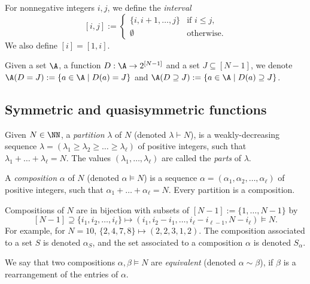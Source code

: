 \begin{definition}
    For nonnegative integers $i,j$, we define the \emph{interval}
    \[
        [i,j] :=
        \begin{cases}
            \{i,i+1,\dots,j\} & \text{if $i \le j$,}\\
            \emptyset & \text{otherwise.}
        \end{cases}
    \]
    We also define $[i] = [1,i]$.
\end{definition}

\begin{definition}
\label{def:elements with given stat}
    Given a set $\A$, a function $D:\A \to 2^{[N-1]}$ and a set $J \subseteq [N-1]$, we denote $\A(D=J) := \{a \in \A \mid D(a) = J\}$ and $\A(D \supseteq J) := \{a \in \A \mid D(a) \supseteq J\}$.
\end{definition}

\subsection{Symmetric and quasisymmetric functions}
\label{subsec:definitions symmetric functions}

\begin{definition}
    Given $N \in \NN$, a \emph{partition} $\lambda$ of $N$ (denoted $\lambda \vdash N$), is a weakly-decreasing sequence $\lambda = (\lambda_1 \ge \lambda_2 \ge \dots \ge \lambda_\ell)$ of positive integers, such that $\lambda_1 + \dots + \lambda_\ell = N$. The values $(\lambda_1,\dots,\lambda_\ell)$ are called the \emph{parts} of $\lambda$.
    
    A \emph{composition} $\alpha$ of $N$ (denoted $\alpha \vDash N$) is a sequence $\alpha = (\alpha_1, \alpha_2, \dots, \alpha_\ell )$ of positive integers, such that $\alpha_1 + \dots + \alpha_\ell = N$. Every partition is a composition.
\end{definition}

Compositions of $N$ are in bijection with subsets of $[N-1] := \{1, \dots, N-1\}$ by 
\[
    [N-1] \supseteq \{i_1, i_2, \dots, i_\ell \} \mapsto (i_1, i_2 - i_1, \dots, i_\ell - i_{\ell-1}, N - i_\ell) \vDash N.
\]
For example, for $N = 10$, $\{2, 4, 7, 8\} \mapsto (2, 2, 3, 1, 2)$. The composition associated to a set $S$ is denoted $\alpha_S$, and the set associated to a composition $\alpha$ is denoted $S_\alpha$.

We say that two compositions $\alpha, \beta \vDash N$ are \emph{equivalent} (denoted $\alpha \sim \beta$), if $\beta$ is a rearrangement of the entries of $\alpha$.


